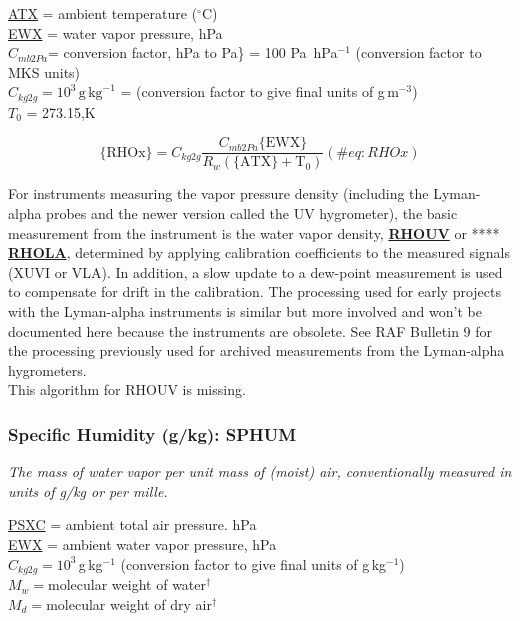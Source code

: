 \documentclass[
  english,
]{book}
\begin{document}
\protect\hyperlink{ambient-t}{ATX} = ambient temperature
(\(^{\circ}\mathrm{C}\))\\
\protect\hyperlink{ewx}{EWX} = water vapor pressure, hPa\\
\(C_{mb2Pa}\)= conversion factor, hPa to Pa\} = 100 Pa~hPa\(^{-1}\)
(conversion factor to MKS units)\\
\(C_{kg2g}=10^{3}\,\mathrm{g\,kg}^{-1}\) = (conversion factor to give
final units of g\(\,\)m\(^{-3}\))\\
\(T_{0}\) = 273.15,K

\begin{equation}
\mathrm{\{RHOx\}} = C_{kg2g}\frac{C_{mb2Pa}\mathrm{\{EWX\}}}{R_{w}\mathrm{(\{ATX\}+T_{0})}}
(\#eq:RHOx)
\end{equation}

For instruments measuring the vapor pressure density (including the
Lyman-alpha probes and the newer version called the UV hygrometer), the
basic measurement from the instrument is the water vapor density,
\textbf{\underline{RHOUV}} or **** \textbf{\underline{RHOLA}},
determined by applying calibration coefficients to the measured signals
(XUVI or VLA). In addition, a slow update to a dew-point measurement is
used to compensate for drift in the calibration. The processing used for
early projects with the Lyman-alpha instruments is similar but more
involved and won't be documented here because the instruments are
obsolete. See RAF Bulletin 9 for the processing previously used for
archived measurements from the Lyman-alpha hygrometers.\\

This algorithm for RHOUV is missing.

\hypertarget{sphum}{%
\subsubsection*{Specific Humidity (g/kg): SPHUM}\label{sphum}}

\emph{The mass of water vapor per unit mass of (moist) air,
conventionally measured in units of g/kg or per mille.}

\protect\hyperlink{psx}{PSXC} = ambient total air pressure. hPa\\
\protect\hyperlink{ewx}{EWX} = ambient water vapor pressure, hPa\\
\(C_{kg2g}=10^{3}\,\)g\(\,\)kg\(^{-1}\) (conversion factor to give final
units of g\(\,\)kg\(^{-1}\))\\
\(M_{w}=\)molecular weight of water\(^{\dagger}\)\\
\(M_{d}=\)molecular weight of dry air\(^{\dagger}\)
\end{document}
